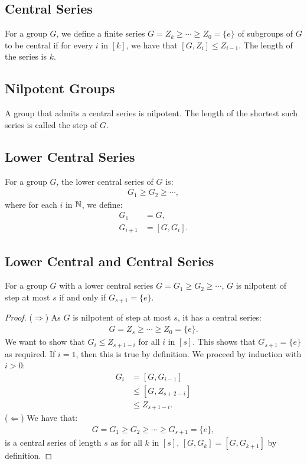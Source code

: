 \subsection{Central Series}

For a group $G$, we define a finite series 
$G = Z_k \geq \cdots \geq Z_0 = \{e\}$ of subgroups of $G$ to be 
central if for every $i$ in $[k]$, we have that 
$[G, Z_i] \leq Z_{i - 1}$. The length of the series is $k$.

\subsection{Nilpotent Groups}

A group that admits a central series is nilpotent. The
length of the shortest such series is called the step of $G$.

\subsection{Lower Central Series}

For a group $G$, the lower central series of $G$ is: \begin{align*}
    G_1 \geq G_2 \geq \cdots,
\end{align*} where for each $i$ in $\mathbb{N}$, we define:
\begin{align*}
    G_1 &= G, \\
    G_{i + 1} &= [G, G_i].
\end{align*}

\subsection{Lower Central and Central Series} \label{8.8}

For a group $G$ with a lower central series 
$G = G_1 \geq G_2 \geq \cdots$, $G$ is nilpotent of step at most
$s$ if and only if $G_{s + 1} = \{e\}$.

\begin{proof}
    ($\Longrightarrow$) As $G$ is nilpotent of step at most $s$,
    it has a central series: \begin{align*}
        G = Z_s \geq \cdots \geq Z_0 = \{e\}.
    \end{align*} We want to show that $G_i \leq Z_{s + 1 - i}$
    for all $i$ in $[s]$. This shows that $G_{s + 1} = \{e\}$
    as required. If $i = 1$, then this is true by definition.
    We proceed by induction with $i > 0$: \begin{align*}
        G_i 
        &= [G, G_{i - 1}] \\
        &\leq [G, Z_{s + 2 - i}] \tag{IH} \\
        &\leq Z_{s + 1 - i}.
    \end{align*}
    ($\Longleftarrow$) We have that: \begin{align*}
        G = G_1 \geq G_2 \geq \cdots \geq G_{s + 1} = \{e\},
    \end{align*} is a central series of length $s$ as
    for all $k$ in $[s]$, $[G, G_k] = [G, G_{k + 1}]$
    by definition. 
\end{proof}

